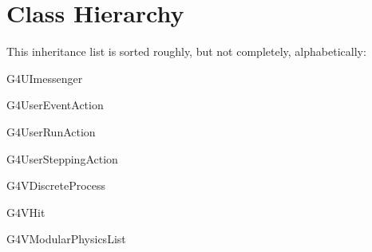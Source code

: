 \section{Class Hierarchy}
This inheritance list is sorted roughly, but not completely, alphabetically\+:\begin{DoxyCompactList}
\item G4\+U\+Imessenger\begin{DoxyCompactList}
\item {}
\end{DoxyCompactList}
\item G4\+User\+Event\+Action\begin{DoxyCompactList}
\item {}
\end{DoxyCompactList}
\item G4\+User\+Run\+Action\begin{DoxyCompactList}
\item {}
\end{DoxyCompactList}
\item G4\+User\+Stepping\+Action\begin{DoxyCompactList}
\item {}
\end{DoxyCompactList}
\item G4\+V\+Discrete\+Process\begin{DoxyCompactList}
\item {}
\end{DoxyCompactList}
\item G4\+V\+Hit\begin{DoxyCompactList}
\item {}
\item {}
\end{DoxyCompactList}
\item G4\+V\+Modular\+Physics\+List\begin{DoxyCompactList}
\item {}

\end{DoxyCompactList}
\end{DoxyCompactList}
